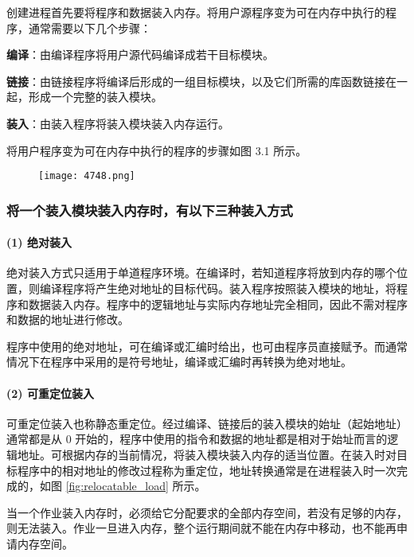 \documentclass{ctexbook}
\begin{document}
	创建进程首先要将程序和数据装入内存。将用户源程序变为可在内存中执行的程序，通常需要以下几个步骤：
	
	
	
\textbf{编译}：由编译程序将用户源代码编译成若干目标模块。
	
\textbf{链接}：由链接程序将编译后形成的一组目标模块，以及它们所需的库函数链接在一起，形成一个完整的装入模块。
	
\textbf{装入}：由装入程序将装入模块装入内存运行。
	
	
	将用户程序变为可在内存中执行的程序的步骤如图 3.1 所示。
	
	\begin{figure}[h]
		\centering
		\texttt{[image: 4748.png]}
		\label{tttttt}
	\end{figure}
	
	\subsubsection{将一个装入模块装入内存时，有以下三种装入方式}
	
	\paragraph{(1) 绝对装入}
	
	绝对装入方式只适用于单道程序环境。在编译时，若知道程序将放到内存的哪个位置，则编译程序将产生绝对地址的目标代码。装入程序按照装入模块的地址，将程序和数据装入内存。程序中的逻辑地址与实际内存地址完全相同，因此不需对程序和数据的地址进行修改。
	
	程序中使用的绝对地址，可在编译或汇编时给出，也可由程序员直接赋予。而通常情况下在程序中采用的是符号地址，编译或汇编时再转换为绝对地址。
	
	\paragraph{(2) 可重定位装入}
	
	可重定位装入也称静态重定位。经过编译、链接后的装入模块的始址（起始地址）通常都是从 0 开始的，程序中使用的指令和数据的地址都是相对于始址而言的逻辑地址。可根据内存的当前情况，将装入模块装入内存的适当位置。在装入时对目标程序中的相对地址的修改过程称为重定位，地址转换通常是在进程装入时一次完成的，如图 \ref{fig:relocatable_load} 所示。
	
	当一个作业装入内存时，必须给它分配要求的全部内存空间，若没有足够的内存，则无法装入。作业一旦进入内存，整个运行期间就不能在内存中移动，也不能再申请内存空间。
\end{document}
